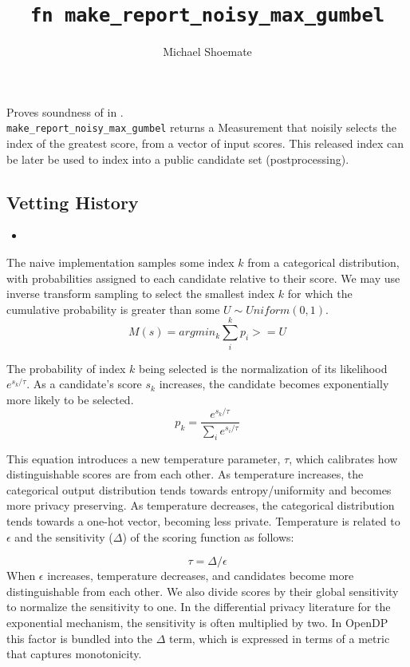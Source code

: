 \documentclass{article}
\title{\texttt{fn make\_report\_noisy\_max\_gumbel}}
\author{Michael Shoemate}
\begin{document}
\maketitle

\contrib

Proves soundness of 
in .\\
\texttt{make\_report\_noisy\_max\_gumbel} returns a Measurement that
noisily selects the index of the greatest score, from a vector of input scores.
This released index can be later be used to index into a public candidate set (postprocessing).

\subsection*{Vetting History}
\begin{itemize}
    \item {}
\end{itemize}

The naive implementation samples some index $k$ from a categorical distribution,
with probabilities assigned to each candidate relative to their score.
We may use inverse transform sampling to select the smallest index $k$ for which the cumulative probability is greater than some $U \sim Uniform(0, 1)$.
\begin{equation}
    \label{m-naive}
    M(s) = argmin_k \sum_i^k p_i >= U
\end{equation}

The probability of index $k$ being selected is the normalization of its likelihood $e^{s_k / \tau}$.
As a candidate's score $s_k$ increases, the candidate becomes exponentially more likely to be selected.
\begin{equation}
    \label{prob-of-k}
    p_k = \frac{e^{s_k / \tau}}{\sum_i e^{s_i / \tau}}
\end{equation}

This equation introduces a new temperature parameter, $\tau$, which calibrates how distinguishable scores are from each other.
As temperature increases, the categorical output distribution tends towards entropy/uniformity and becomes more privacy preserving.
As temperature decreases, the categorical distribution tends towards a one-hot vector, becoming less private.
Temperature is related to $\epsilon$ and the sensitivity ($\Delta$) of the scoring function as follows:

\begin{equation}
    \tau = \Delta / \epsilon
\end{equation}
When $\epsilon$ increases, temperature decreases, and candidates become more distinguishable from each other.
We also divide scores by their global sensitivity to normalize the sensitivity to one.
In the differential privacy literature for the exponential mechanism, the sensitivity is often multiplied by two.
In OpenDP this factor is bundled into the $\Delta$ term, which is expressed in terms of a metric that captures monotonicity.
\end{document}

